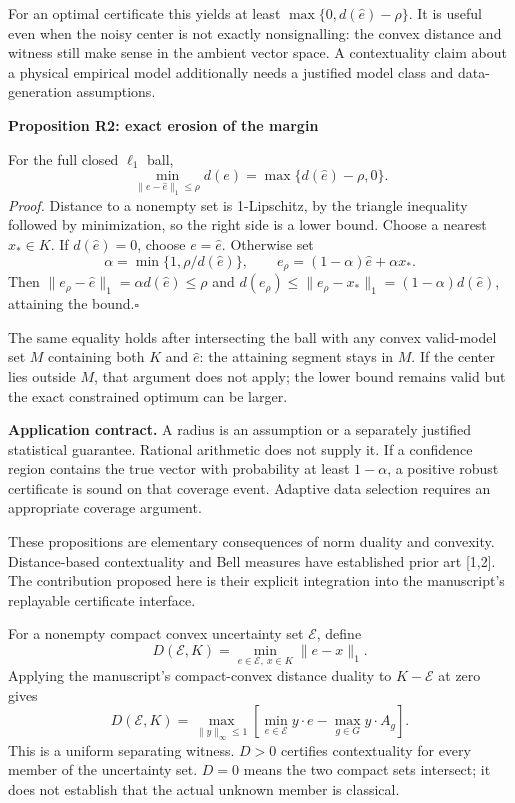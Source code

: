 \documentclass[11pt,letterpaper]{article}
\newcommand{\sect}[1]{\vspace{3pt}{\Large\sffamily\bfseries\color{ink}#1}\par\vspace{3pt}}
\newcommand{\sub}[1]{{\bfseries\color{ink}#1}\par}
\newcommand{\note}[1]{\par\vspace{3pt}\noindent\colorbox{pale}{\parbox{\dimexpr\linewidth-2\fboxsep}{#1}}\par\vspace{3pt}}
\begin{document}
For an optimal certificate this yields at least $\max\{0,d(\widehat e)-\rho\}$. It is useful even when the noisy center is not exactly nonsignalling: the convex distance and witness still make sense in the ambient vector space. A contextuality claim about a physical empirical model additionally needs a justified model class and data-generation assumptions.

\sub{Proposition R2: exact erosion of the margin}
For the full closed $\ell_1$ ball,
\[
\boxed{\quad \min_{\|e-\widehat e\|_1\leq\rho}d(e)
       =\max\{d(\widehat e)-\rho,0\}.\quad}
\]
\textit{Proof.} Distance to a nonempty set is 1-Lipschitz, by the triangle inequality followed by minimization, so the right side is a lower bound. Choose a nearest $x_*\in K$. If $d(\widehat e)=0$, choose $e=\widehat e$. Otherwise set
\[
 \alpha=\min\{1,\rho/d(\widehat e)\},\qquad
 e_\rho=(1-\alpha)\widehat e+\alpha x_*.
\]
Then $\|e_\rho-\widehat e\|_1=\alpha d(\widehat e)\leq\rho$ and
$d(e_\rho)\leq\|e_\rho-x_*\|_1=(1-\alpha)d(\widehat e)$, attaining the bound.\hfill$\square$

The same equality holds after intersecting the ball with any convex valid-model set $M$ containing both $K$ and $\widehat e$: the attaining segment stays in $M$. If the center lies outside $M$, that argument does not apply; the lower bound remains valid but the exact constrained optimum can be larger.

\note{\textbf{Application contract.} A radius is an assumption or a separately justified statistical guarantee. Rational arithmetic does not supply it. If a confidence region contains the true vector with probability at least $1-\alpha$, a positive robust certificate is sound on that coverage event. Adaptive data selection requires an appropriate coverage argument.}

These propositions are elementary consequences of norm duality and convexity. Distance-based contextuality and Bell measures have established prior art [1,2]. The contribution proposed here is their explicit integration into the manuscript's replayable certificate interface.

\newpage
\sect{A certificate for an entire uncertainty set}
For a nonempty compact convex uncertainty set $\mathcal E$, define
\[
 D(\mathcal E,K)=\min_{e\in\mathcal E,\ x\in K}\|e-x\|_1.
\]
Applying the manuscript's compact-convex distance duality to $K-\mathcal E$ at zero gives
\[
\boxed{\quad D(\mathcal E,K)=
 \max_{\|y\|_\infty\leq1}
 \left[\min_{e\in\mathcal E}y\cdot e-\max_{g\in G}y\cdot A_g\right].\quad}
\]
This is a uniform separating witness. $D>0$ certifies contextuality for every member of the uncertainty set. $D=0$ means the two compact sets intersect; it does not establish that the actual unknown member is classical.
\end{document}
